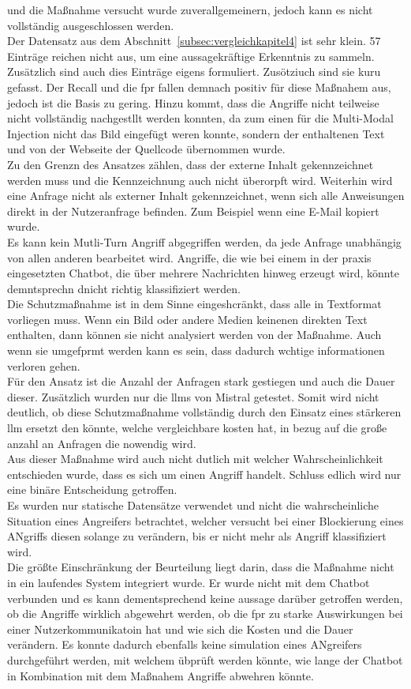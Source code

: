 und die Maßnahme versucht wurde zuverallgemeinern, jedoch kann es nicht vollständig ausgeschlossen werden. \\
Der Datensatz aus dem Abschnitt~\ref{subsec:vergleichkapitel4} ist sehr klein. 57 Einträge reichen nicht aus, um eine aussagekräftige Erkenntnis zu sammeln. Zusätzlich
sind auch dies Einträge eigens formuliert. Zusötziuch sind sie kuru gefasst. Der Recall und die \ac{fpr} fallen demnach positiv für diese Maßnahem aus, jedoch 
ist die Basis zu gering. Hinzu kommt, dass die Angriffe nicht teilweise nicht vollständig nachgestllt werden konnten, da zum einen für die Multi-Modal Injection
nicht das Bild eingefügt weren konnte, sondern der enthaltenen Text und von der Webseite der Quellcode übernommen wurde. \\
Zu den Grenzn des Ansatzes zählen, dass der externe Inhalt gekennzeichnet werden muss und die Kennzeichnung auch nicht überorpft wird. Weiterhin wird eine 
Anfrage nicht als externer Inhalt gekennzeichnet, wenn sich alle Anweisungen direkt in der Nutzeranfrage befinden. Zum Beispiel wenn eine E-Mail kopiert wurde.\\
Es kann kein Mutli-Turn Angriff abgegriffen werden, da jede Anfrage unabhängig von allen anderen bearbeitet wird. Angriffe, die wie bei einem in der praxis 
eingesetzten Chatbot, die über mehrere Nachrichten hinweg erzeugt wird, könnte demntsprechn dnicht richtig klassifiziert werden. \\
Die Schutzmaßnahme ist in dem Sinne eingeshcränkt, dass alle in Textformat vorliegen muss. Wenn ein Bild oder andere Medien keinenen direkten Text enthalten, 
dann können sie nicht analysiert werden von der Maßnahme. Auch wenn sie umgefprmt werden kann es sein, dass dadurch wchtige informationen verloren gehen. \\
Für den Ansatz ist die Anzahl der Anfragen stark gestiegen und auch die Dauer dieser. Zusätzlich wurden nur die \acp{llm} von Mistral getestet. Somit wird nicht
deutlich, ob diese Schutzmaßnahme vollständig durch den Einsatz eines stärkeren \ac{llm} ersetzt den könnte, welche vergleichbare kosten hat, in bezug auf die 
große anzahl an Anfragen die nowendig wird. \\
Aus dieser Maßnahme wird auch nicht dutlich mit welcher Wahrscheinlichkeit entschieden wurde, dass es sich um einen Angriff handelt. Schluss edlich wird nur eine 
binäre Entscheidung getroffen. \\
Es wurden nur statische Datensätze verwendet und nicht die wahrscheinliche Situation eines Angreifers betrachtet, welcher versucht bei einer Blockierung eines 
ANgriffs diesen solange zu verändern, bis er nicht mehr als Angriff klassifiziert wird. \\
Die größte Einschränkung der Beurteilung liegt darin, dass die Maßnahme nicht in ein laufendes System integriert wurde. Er wurde nicht mit dem Chatbot verbunden und
es kann dementsprechend keine aussage darüber getroffen werden, ob die Angriffe wirklich abgewehrt werden, ob die \ac{fpr} zu starke Auswirkungen bei einer 
Nutzerkommunikatoin hat und wie sich die Kosten und die Dauer verändern. Es konnte dadurch ebenfalls keine simulation eines ANgreifers durchgeführt werden, mit welchem
übprüft werden könnte, wie lange der Chatbot in Kombination mit dem Maßnahem Angriffe abwehren könnte. 